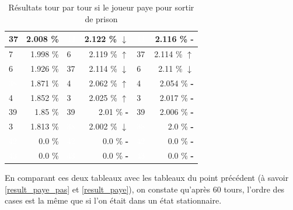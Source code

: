 \documentclass[letterpaper]{article}
\newcommand{\caseUp}[1][]{#1\textcolor[HTML]{008000}{$\mathbf{\uparrow}$}}
\newcommand{\caseStable}[1][]{#1\textcolor[HTML]{3779dd}{\textbf{-}}}
\newcommand{\caseDown}[1][]{#1\textcolor[HTML]{dd3737}{$\mathbf{\downarrow}$}}
\begin{document}
\begin{table}
\begin{tabular}{|l|r||l|r||l|r|}
	    \cellcolor[HTML]{FFC1C1} 37 & 2.008 \% & \cellcolor[HTML]{000000} \textcolor{white}{11} & 2.122 \% \caseDown[\hfill] & \cellcolor[HTML]{000000} \textcolor{white}{11} & 2.116 \% \caseStable[\hfill] \\ \hline 
	    \cellcolor[HTML]{1E90FF}  7 & 1.998 \% & \cellcolor[HTML]{E6E6FA}  6 & 2.119 \% \caseUp[\hfill] & \cellcolor[HTML]{FFC1C1} 37 & 2.114 \% \caseUp[\hfill] \\ \hline 
	    \cellcolor[HTML]{E6E6FA}  6 & 1.926 \% & \cellcolor[HTML]{FFC1C1} 37 & 2.114 \% \caseDown[\hfill] & \cellcolor[HTML]{E6E6FA} 6 & 2.11 \% \caseDown[\hfill] \\ \hline 
	    \cellcolor[HTML]{483D8B} \textcolor{white}{38} & 1.871 \% & \cellcolor[HTML]{A0522D}  4 & 2.062 \% \caseUp[\hfill] & \cellcolor[HTML]{A0522D} 4 & 2.054 \% \caseStable[\hfill] \\ \hline 
	    \cellcolor[HTML]{A0522D}  4 & 1.852 \% & \cellcolor[HTML]{EEEED1}  3 & 2.025 \% \caseUp[\hfill] & \cellcolor[HTML]{EEEED1} 3 & 2.017 \% \caseStable[\hfill] \\ \hline 
	    \cellcolor[HTML]{8B1A1A} 39 & 1.85 \%  & \cellcolor[HTML]{8B1A1A} 39 & 2.01 \% \caseStable[\hfill] & \cellcolor[HTML]{8B1A1A} 39 & 2.006 \% \caseStable[\hfill] \\ \hline 
	    \cellcolor[HTML]{EEEED1}  3 & 1.813 \% & \cellcolor[HTML]{483D8B} \textcolor{white}{38} & 2.002 \% \caseDown[\hfill] & \cellcolor[HTML]{483D8B} \textcolor{white}{38} & 2.0 \% \caseStable[\hfill] \\ \hline 
	    \cellcolor[HTML]{000000} \textcolor{white}{42} & 0.0 \%   & \cellcolor[HTML]{000000} \textcolor{white}{42} & 0.0 \% \caseStable[\hfill] & \cellcolor[HTML]{000000} \textcolor{white}{42} & 0.0 \% \caseStable[\hfill] \\ \hline 
	    \cellcolor[HTML]{000000} \textcolor{white}{43} & 0.0 \%   & \cellcolor[HTML]{000000} \textcolor{white}{43} & 0.0 \% \caseStable[\hfill] & \cellcolor[HTML]{000000} \textcolor{white}{43} & 0.0 \% \caseStable[\hfill] \\ \hline
	\end{tabular}
	\caption{Résultats tour par tour si le joueur paye pour 
	sortir de prison}
	\label{result_tour_paye}
      \end{table}

      En comparant ces deux tableaux avec les tableaux du point précédent 
      (à savoir \ref{result_paye_pas} et \ref{result_paye}), on constate
      qu'après 60 tours, l'ordre des cases est la même que si l'on était
      dans un état stationnaire.
    
\end{document}
